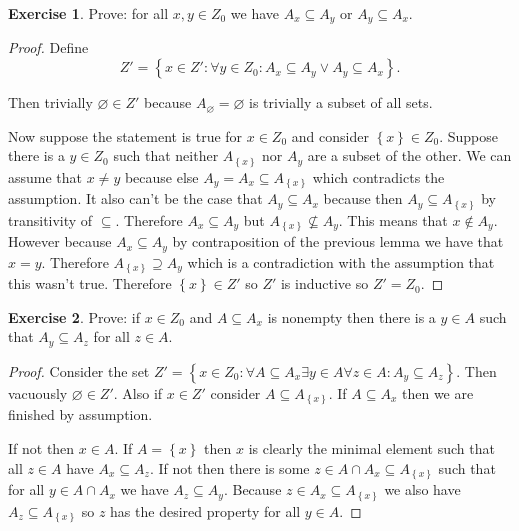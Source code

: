 \documentclass{article}
\theoremstyle{definition}
\newtheorem{question}{Exercise}
\newcommand{\set}[1]{\left\{#1\right\}}
\newcommand{\setwith}[2]{\set{#1\colon#2}}
\begin{document}
\begin{question}
    Prove: for all \(x,y\in Z_{0}\) we have \(A_{x}\subseteq A_{y}\) or
    \(A_{y}\subseteq A_{x}\).

    \begin{proof}
        Define
        \[
            Z'=\setwith{x\in Z'}{\forall y\in Z_{0}:A_{x}\subseteq A_{y}\vee A_{y}\subseteq A_{x}}.
        \]

        Then trivially \(\varnothing\in Z'\) because
        \(A_{\varnothing}=\varnothing\) is trivially a subset of all sets.

        Now suppose the statement is true for \(x\in Z_{0}\) and consider
        \(\set{x}\in Z_{0}\). Suppose there is a \(y\in Z_{0}\) such that
        neither \(A_{\set{x}}\) nor \(A_{y}\) are a subset of the other. We can
        assume that \(x\neq y\) because else \(A_{y}=A_{x}\subseteq
        A_{\set{x}}\) which contradicts the assumption. It also can't be the
        case that \(A_{y}\subseteq A_{x}\) because then \(A_{y}\subseteq
        A_{\set{x}}\) by transitivity of \(\subseteq\). Therefore
        \(A_{x}\subseteq A_{y}\) but \(A_{\set{x}}\nsubseteq A_{y}\). This means
        that \(x\notin A_{y}\). However because \(A_{x}\subseteq A_{y}\) by
        contraposition of the previous lemma we have that \(x=y\). Therefore
        \(A_{\set{x}}\supseteq A_{y}\) which is a contradiction with the
        assumption that this wasn't true. Therefore \(\set{x}\in Z'\) so \(Z'\)
        is inductive so \(Z'=Z_{0}\).
    \end{proof}
\end{question}

\begin{question}
    Prove: if \(x\in Z_{0}\) and \(A\subseteq A_{x}\) is nonempty then there is
    a \(y\in A\) such that \(A_{y}\subseteq A_{z}\) for all \(z\in A\).

    \begin{proof}
        Consider the set \(Z'=\setwith{x\in Z_{0}}{\forall A\subseteq
            A_{x}\exists y\in A\forall z\in A: A_{y}\subseteq A_{z}}\). Then
        vacuously \(\varnothing\in Z'\). Also if \(x\in Z'\) consider
        \(A\subseteq A_{\set{x}}\). If \(A\subseteq A_{x}\) then we are
        finished by assumption.

        If not then \(x\in A\). If \(A=\set{x}\) then \(x\) is clearly the
        minimal element such that all \(z\in A\) have \(A_{x}\subseteq A_{z}\).
        If not then there is some \(z\in A\cap A_{x}\subseteq A_{\set{x}}\) such
        that for all \(y\in A\cap A_{x}\) we have \(A_{z}\subseteq A_{y}\).
        Because \(z\in A_{x}\subseteq A_{\set{x}}\) we also have
        \(A_{z}\subseteq A_{\set{x}}\) so \(z\) has the desired property for all
        \(y\in A\).
    \end{proof}
\end{question}
\end{document}
